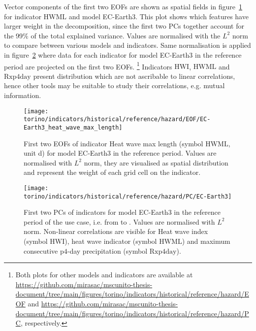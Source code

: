 Vector components of the first two \glspl{EOF} are shown as spatial fields in figure~\ref{fig:EOF_EC-Earth3_heat_wave_max_length} for indicator $\mathrm{HWML}$ and model EC-Earth3. This plot shows which features have larger weight in the decomposition, since the first two \glspl{PC} together account for the 99\% of the total explained variance. Values are normalised with the $L^2$ norm to compare between various models and indicators. Same normalisation is applied in figure~\ref{fig:PC_EC-Earth3} where data for each indicator for model EC-Earth3 in the reference period are projected on the first two \glspl{EOF}.%
\footnote{Both plots for other models and indicators are available at \url{https://github.com/mirasac/mscunito-thesis-document/tree/main/figures/torino/indicators/historical/reference/hazard/EOF} and \url{https://github.com/mirasac/mscunito-thesis-document/tree/main/figures/torino/indicators/historical/reference/hazard/PC}, respectively.}
Indicators $\mathrm{HWI}$, $\mathrm{HWML}$ and $\mathrm{Rxp4day}$ present distribution which are not ascribable to linear correlations, hence other tools may be suitable to study their correlations, e.g. mutual information.

\begin{figure}[h]
  \centering
  \texttt{[image: torino/indicators/historical/reference/hazard/EOF/EC-Earth3\_heat\_wave\_max\_length]}
  \caption{First two \glspl{EOF} of indicator {Heat wave max length} (symbol $\mathrm{HWML}$, unit \unit{\day}) for model EC-Earth3 in the reference period. Values are normalised with $L^2$ norm, they are visualised as spatial distribution and represent the weight of each grid cell on the indicator.}
  \label{fig:EOF_EC-Earth3_heat_wave_max_length}
\end{figure}
\begin{figure}[h]
  \centering
  \texttt{[image: torino/indicators/historical/reference/hazard/PC/EC-Earth3]}
  \caption{First two \glspl{PC} of indicators for model EC-Earth3 in the reference period of the use case, i.e. from  to . Values are normalised with $L^2$ norm. Non-linear correlations are visible for {Heat wave index} (symbol $\mathrm{HWI}$), heat wave indicator (symbol $\mathrm{HWML}$) and maximum consecutive $\mathrm{p4}$-day precipitation (symbol $\mathrm{Rxp4day}$).}
  \label{fig:PC_EC-Earth3}
\end{figure}

